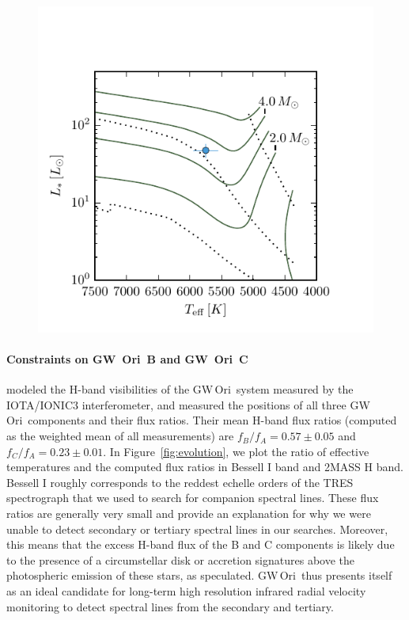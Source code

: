 \documentclass[twocolumn]{aastex61}
\newcommand{\gw}{GW\,Ori}
\begin{document}
\begin{figure}[htb]
\begin{center}
  \includegraphics{tracks.pdf}
  \end{center}
\end{figure}


\paragraph{Constraints on GW~Ori~B and GW~Ori~C}
\citet{berger11} modeled the H-band visibilities of the \gw\ system measured by the IOTA/IONIC3 interferometer, and measured the positions of all three \gw\ components and their flux ratios. Their mean H-band flux ratios (computed as the weighted mean of all measurements) are $f_B/f_A = 0.57 \pm 0.05$ and $f_C/f_A = 0.23 \pm 0.01$. In Figure~\ref{fig:evolution}, we plot the ratio of effective temperatures and the computed flux ratios in Bessell I band and 2MASS H band. Bessell I roughly corresponds to the reddest echelle orders of the TRES spectrograph that we used to search for companion spectral lines. These flux ratios are generally very small and provide an explanation for why we were unable to detect secondary or tertiary spectral lines in our searches. Moreover, this means that the excess H-band flux of the B and C components is likely due to the presence of a circumstellar disk or accretion signatures above the photospheric emission of these stars, as \citet{berger11} speculated. \gw\ thus presents itself as an ideal candidate for long-term high resolution infrared radial velocity monitoring to detect spectral lines from the secondary and tertiary.
\end{document}
